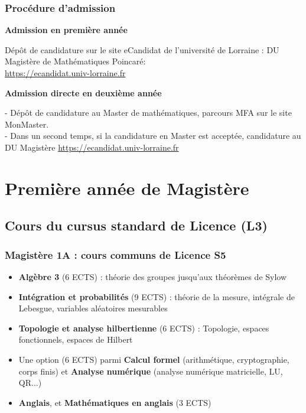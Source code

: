 \documentclass[slidetop,11pt]{beamer}
\begin{document}
\begin{frame}
\frametitle{Procédure d'admission}

\textbf{Admission en première année}

\bigskip
Dépôt de candidature sur le site eCandidat de l'université de Lorraine : \og DU Magistère de Mathématiques Poincaré\fg : \\
\url{https://ecandidat.univ-lorraine.fr}

\bigskip
\textbf{Admission directe en deuxième année}

\bigskip
- Dépôt de candidature au Master de mathématiques, parcours MFA sur le site MonMaster.\\
- Dans un second temps, si la candidature en Master est acceptée, candidature au DU Magistère \url{https://ecandidat.univ-lorraine.fr}


\end{frame}



\section{Première année de Magistère}

\subsection{Cours du cursus standard de Licence (L3)}

\begin{frame}
\frametitle{Magistère 1A : cours communs de Licence S5}
\begin{itemize}
\item \textbf{Algèbre 3} (6 ECTS) : théorie des groupes jusqu'aux théorèmes de Sylow
\item \textbf{Intégration et probabilités} (9 ECTS) : théorie de la mesure, intégrale de Lebesgue, variables aléatoires mesurables
\item \textbf{Topologie et analyse hilbertienne} (6 ECTS) : Topologie, espaces fonctionnels, espaces de Hilbert
\item Une option (6 ECTS) parmi \textbf{Calcul formel} (arithmétique, cryptographie, corps finis) et \textbf{Analyse numérique} (analyse numérique matricielle, LU, QR...)
\item \textbf{Anglais}, et \textbf{Mathématiques en anglais} (3 ECTS)
\end{itemize}
\end{frame}
\end{document}
